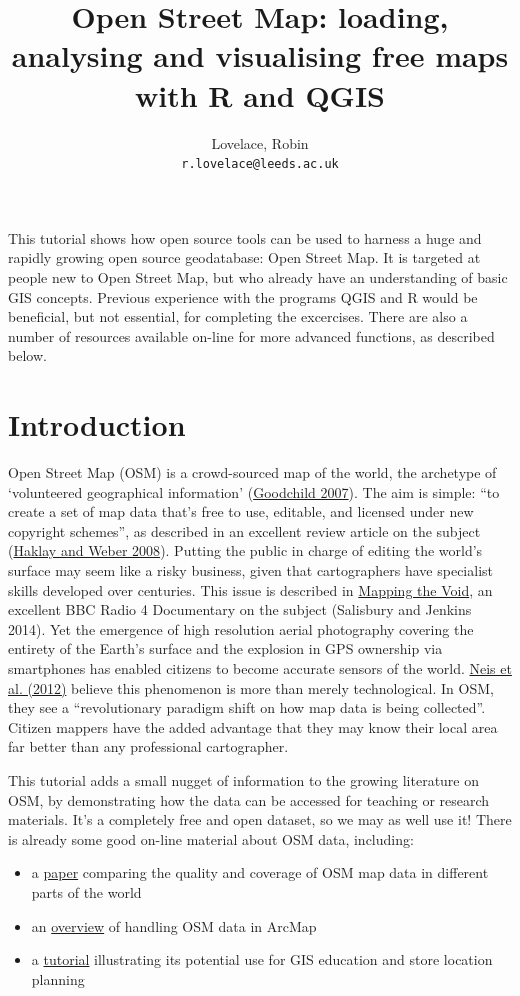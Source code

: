 \documentclass[]{article}
\author{
Lovelace, Robin\\
\texttt{r.lovelace@leeds.ac.uk}
}
\title{Open Street Map: loading, analysing and visualising free maps with R and QGIS}
\author{}
\date{}
\begin{document}
This tutorial shows how open source tools can be used to harness a huge
and rapidly growing open source geodatabase: Open Street Map. It is
targeted at people new to Open Street Map, but who already have an
understanding of basic GIS concepts. Previous experience with the
programs QGIS and R would be beneficial, but not essential, for
completing the excercises. There are also a number of resources
available on-line for more advanced functions, as described below.

\section{Introduction}

Open Street Map (OSM) is a crowd-sourced map of the world, the archetype
of `volunteered geographical information'
(\href{http://www.ncgia.ucsb.edu/projects/vgi/docs/position/Goodchild\_VGI2007.pdf}{Goodchild
2007}). The aim is simple: ``to create a set of map data that's free to
use, editable, and licensed under new copyright schemes'', as described
in an excellent review article on the subject
(\href{http://discovery.ucl.ac.uk/13849/1/13849.pdf}{Haklay and Weber
2008}). Putting the public in charge of editing the world's surface may
seem like a risky business, given that cartographers have specialist
skills developed over centuries. This issue is described in
\href{https://dl.dropboxusercontent.com/u/15008199/egs2stay/Mapping\_the\_Void\_-\_Mapping\_the\_Void\_b03s6mf0\_default.m4a}{Mapping
the Void}, an excellent BBC Radio 4 Documentary on the subject
(Salisbury and Jenkins 2014). Yet the emergence of high resolution
aerial photography covering the entirety of the Earth's surface and the
explosion in GPS ownership via smartphones has enabled citizens to
become accurate sensors of the world.
\href{http://www.mdpi.com/1999-5903/4/1/1/pdf}{Neis et al. (2012)}
believe this phenomenon is more than merely technological. In OSM, they
see a ``revolutionary paradigm shift on how map data is being
collected''. Citizen mappers have the added advantage that they may know
their local area far better than any professional cartographer.

This tutorial adds a small nugget of information to the growing
literature on OSM, by demonstrating how the data can be accessed for
teaching or research materials. It's a completely free and open dataset,
so we may as well use it! There is already some good on-line material
about OSM data, including:

\begin{itemize}
\item
  a \href{http://www.mdpi.com/1999-5903/5/2/282/pdf}{paper} comparing
  the quality and coverage of OSM map data in different parts of the
  world
\item
  an
  \href{http://www.library.carleton.ca/sites/default/files/help/gis/WorkingWithOpenStreetMap.pdf}{overview}
  of handling OSM data in ArcMap
\item
  a
  \href{http://elogeo.nottingham.ac.uk/xmlui/bitstream/handle/url/289/osm-tutorial-final-2.pdf?sequence=1}{tutorial}
  illustrating its potential use for GIS education and store location
  planning
\end{itemize}
\end{document}
